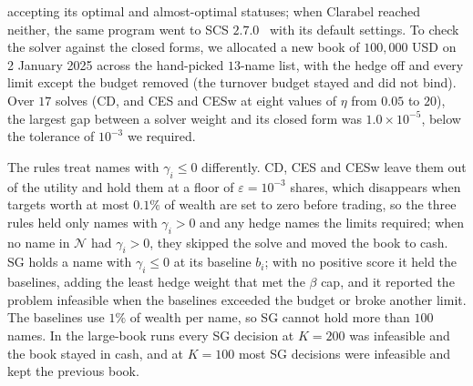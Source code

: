 accepting its optimal and almost-optimal statuses; when Clarabel reached neither, the same program went to SCS
$2.7.0$~\cite{odonoghue2016scs} with its default settings. To check the solver against the closed forms, we allocated
a new book of $100{,}000$ USD on 2 January 2025 across the hand-picked $13$-name list, with the hedge off and every
limit except the budget removed (the turnover budget stayed and did not bind). Over $17$ solves (CD, and CES and CESw
at eight values of $\eta$ from $0.05$ to $20$), the largest gap between a solver weight and its closed form was
$1.0 \times 10^{-5}$, below the tolerance of $10^{-3}$ we required.

The rules treat names with $\gamma_i \le 0$ differently. CD, CES and CESw leave them out of the utility and hold them
at a floor of $\varepsilon = 10^{-3}$ shares, which disappears when targets worth at most $0.1\%$ of wealth are set
to zero before trading, so the three rules held only names with $\gamma_i > 0$ and any hedge names the limits
required; when no name in $\mathcal{N}$ had $\gamma_i > 0$, they skipped the solve and moved the book to cash. SG
holds a name with $\gamma_i \le 0$ at its baseline $b_i$; with no positive score it held the baselines, adding the
least hedge weight that met the $\beta$ cap, and it reported the problem infeasible when the baselines exceeded the
budget or broke another limit. The baselines use $1\%$ of wealth per name, so SG cannot hold more than $100$ names.
In the large-book runs every SG decision at $K = 200$ was infeasible and the book stayed in cash, and at $K = 100$ most
SG decisions were infeasible and kept the previous book.

